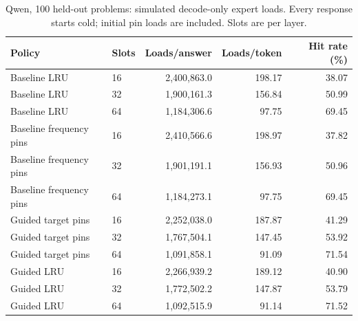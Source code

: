 \begin{table}[ht]
\centering\small
\caption{Qwen, 100 held-out problems: simulated decode-only expert loads. Every response starts cold; initial pin loads are included. Slots are per layer.}
\label{tab:qwen-cache-100-loads}
\begin{tabular}{llrrr}
\toprule
Policy & Slots & Loads/answer & Loads/token & Hit rate (\%) \\
\midrule
Baseline LRU & 16 & 2,400,863.0 & 198.17 & 38.07 \\
Baseline LRU & 32 & 1,900,161.3 & 156.84 & 50.99 \\
Baseline LRU & 64 & 1,184,306.6 & 97.75 & 69.45 \\
Baseline frequency pins & 16 & 2,410,566.6 & 198.97 & 37.82 \\
Baseline frequency pins & 32 & 1,901,191.1 & 156.93 & 50.96 \\
Baseline frequency pins & 64 & 1,184,273.1 & 97.75 & 69.45 \\
Guided target pins & 16 & 2,252,038.0 & 187.87 & 41.29 \\
Guided target pins & 32 & 1,767,504.1 & 147.45 & 53.92 \\
Guided target pins & 64 & 1,091,858.1 & 91.09 & 71.54 \\
Guided LRU & 16 & 2,266,939.2 & 189.12 & 40.90 \\
Guided LRU & 32 & 1,772,502.2 & 147.87 & 53.79 \\
Guided LRU & 64 & 1,092,515.9 & 91.14 & 71.52 \\
\bottomrule
\end{tabular}
\end{table}
